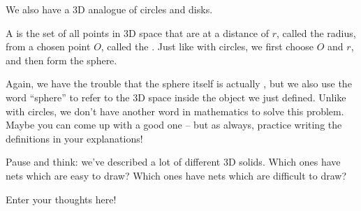 \documentclass{ximera}
\begin{document}
We also have a 3D analogue of circles and disks. 
\begin{definition}
	A  is the set of all points in 3D space that are at a distance of $r$, called the radius, from a chosen point $O$, called the . Just like with circles, we first choose $O$ and $r$, and then form the sphere.
\end{definition}
Again, we have the trouble that the sphere itself is actually , but we also use the word ``sphere'' to refer to the 3D space inside the object we just defined. Unlike with circles, we don't have another word in mathematics to solve this problem. Maybe you can come up with a good one -- but as always, practice writing the definitions in your explanations!




\begin{question}
Pause and think: we've described a lot of different 3D solids. Which ones have nets which are easy to draw? Which ones have nets which are difficult to draw?
\begin{freeResponse}
Enter your thoughts here!
\end{freeResponse}
\end{question}
\end{document}
